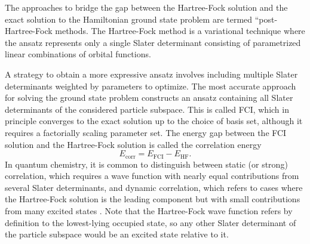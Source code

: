 \documentclass[../main.tex]{subfiles}
\begin{document}
The approaches to bridge the gap between the Hartree-Fock solution and the exact solution to the Hamiltonian ground state problem are termed ``post-Hartree-Fock methods. The Hartree-Fock method is a variational technique where the ansatz represents only a single Slater determinant consisting of parametrized linear combinations of orbital functions.

A strategy to obtain a more expressive ansatz involves including multiple Slater determinants weighted by parameters to optimize. The most accurate approach for solving the ground state problem constructs an ansatz containing all Slater determinants of the considered particle subspace. This is called \ac{FCI}, which in principle converges to the exact solution up to the choice of basis set, although it requires a factorially scaling parameter set. The energy gap between the FCI solution and the Hartree-Fock solution is called the correlation energy
\begin{equation}
    E_\mathrm{corr} = E_\mathrm{FCI} -E_\mathrm{HF} .
\end{equation} In quantum chemistry, it is common to distinguish between static (or strong) correlation, which requires a wave function with nearly equal contributions from several Slater determinants, and dynamic correlation, which refers to cases where the Hartree-Fock solution is the leading component but with small contributions from many excited states \cite{benavides2017towards}. Note that the Hartree-Fock wave function refers by definition to the lowest-lying occupied state, so any other Slater determinant of the particle subspace would be an excited state relative to it.
\end{document}
